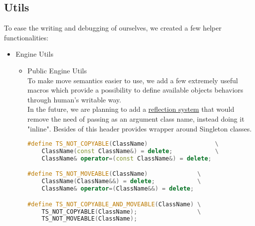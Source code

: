 \newpage
\subsection{Utils}
\label{sec:utils}
To ease the writing and debugging of ourselves, we created a few helper functionalities:
\begin{itemize}
    \item Engine Utils
    \begin{itemize}
        \item Public Engine Utils\\
        To make move semantics easier to use, we add a few extremely useful macros which provide a possibility to define available objects behaviors through human's writable way.\\
        In the future, we are planning to add a \hyperref[sec:refl]{reflection system} that would remove the need of passing as an argument class name, instead doing it "inline". Besides of this header provides wrapper around Singleton classes.\\
        
\begin{lstlisting}[language=c++, caption=Preprocessor definitions of public Engine Utils(./engine/include/tsengine/utils.hpp)]
#define TS_NOT_COPYABLE(ClassName)                   \
    ClassName(const ClassName&) = delete;            \
    ClassName& operator=(const ClassName&) = delete;

#define TS_NOT_MOVEABLE(ClassName)              \
    ClassName(ClassName&&) = delete;            \
    ClassName& operator=(ClassName&&) = delete;

#define TS_NOT_COPYABLE_AND_MOVEABLE(ClassName) \
    TS_NOT_COPYABLE(ClassName);                 \
    TS_NOT_MOVEABLE(ClassName);


\end{lstlisting}
\end{itemize}
\end{itemize}
